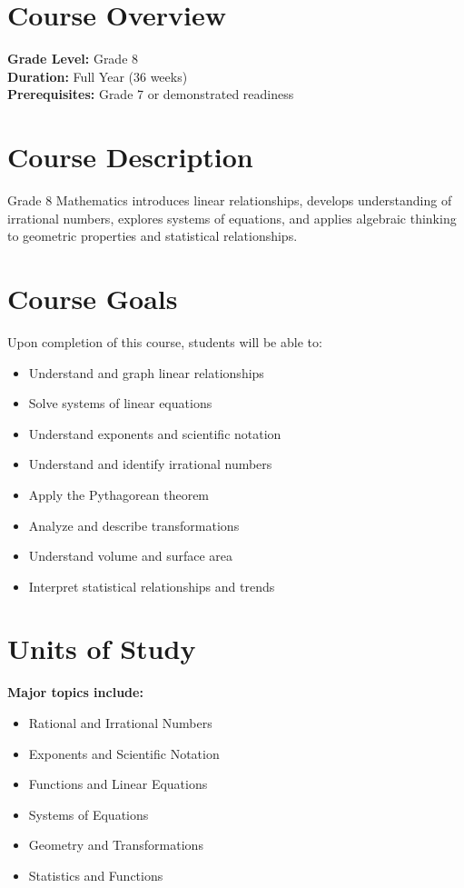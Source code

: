 \documentclass[11pt,letterpaper]{report}
\begin{document}
\section{Course Overview}

\textbf{Grade Level:} Grade 8\\
\textbf{Duration:} Full Year (36 weeks)\\
\textbf{Prerequisites:} Grade 7 or demonstrated readiness

\section{Course Description}

Grade 8 Mathematics introduces linear relationships, develops understanding of irrational numbers, explores systems of equations, and applies algebraic thinking to geometric properties and statistical relationships.

\section{Course Goals}

Upon completion of this course, students will be able to:

\begin{itemize}
    \item Understand and graph linear relationships
    \item Solve systems of linear equations
    \item Understand exponents and scientific notation
    \item Understand and identify irrational numbers
    \item Apply the Pythagorean theorem
    \item Analyze and describe transformations
    \item Understand volume and surface area
    \item Interpret statistical relationships and trends
\end{itemize}

\section{Units of Study}

\textbf{Major topics include:}
\begin{itemize}
    \item Rational and Irrational Numbers
    \item Exponents and Scientific Notation
    \item Functions and Linear Equations
    \item Systems of Equations
    \item Geometry and Transformations
    \item Statistics and Functions
\end{itemize}
\end{document}
